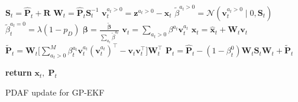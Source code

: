 \begin{algorithm}[h]
    \begin{algorithmic}[1]
        \State $\boldsymbol{S}_t = \hat{\boldsymbol{P}}_t + \boldsymbol{R}$ 
        \State $\boldsymbol{W}_t = \hat{\boldsymbol{P}}_t \boldsymbol{S}_t^{-1}$
        \State $\boldsymbol{v}_t^{a_t>0} = \boldsymbol{z}^{a_t>0} - \hat{\boldsymbol{x}}_t$ 
        \State $\tilde{\beta}^{a_t>0} = \mathcal{N}(\boldsymbol{v}_t^{a_t > 0} \; | \; 0, \boldsymbol{S}_t)$ 
        \EndFor
        \State $\tilde{\beta}_t^{a_t = 0} = \lambda (1-p_D)$ 
        \State $\boldsymbol{\beta} = \frac{\tilde{\boldsymbol{\beta}}}{\sum_{a_t} \tilde{\beta}^{a_t}}$ 
        \State $\boldsymbol{v}_t = \sum_{a_t > 0} \beta^{a_t} \boldsymbol{v}_t^{a_t}$
        \State $\boldsymbol{x}_t = \hat{\boldsymbol{x}}_t + \boldsymbol{W}_t \boldsymbol{v}_t$
        \State $\tilde{\boldsymbol{P}}_t = \boldsymbol{W}_t \big[\sum_{a_t > 0}^M \beta_t^{a_t} \boldsymbol{v}_t^{a_t} (\boldsymbol{v}_t^{a_t})^\intercal - \boldsymbol{v}_t \boldsymbol{v}_t^\intercal \big] \boldsymbol{W}_t^\intercal$
        \State $\boldsymbol{P}_t = \hat{\boldsymbol{P}}_t - (1 - \beta_t^{0}) \boldsymbol{W}_t \boldsymbol{S}_t  \boldsymbol{W}_t + \tilde{\boldsymbol{P}}_t$ 


        \State \textbf{return} $\boldsymbol{x}_t, \; \boldsymbol{P}_t$
        \EndProcedure
    \end{algorithmic}
    \caption{PDAF update for GP-EKF}
    \label{alg:gp_ekf_pdaf}
\end{algorithm}


